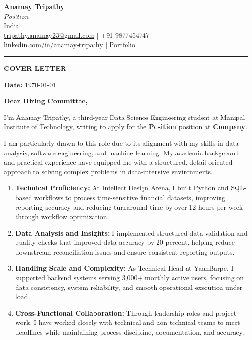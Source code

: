 \documentclass[11pt,a4]{article}
\begin{document}
\begin{center}
    \textbf{\Large Anamay Tripathy} \\[4pt]
    \textit{Position} \\
    India \\[4pt]
    \href{mailto:tripathy.anamay23@gmail.com}{tripathy.anamay23@gmail.com}
    \quad | \quad +91 9877454747 \\
    \href{https://www.linkedin.com/in/anamay-tripathy-b53829296/}{linkedin.com/in/anamay-tripathy}
    \quad | \quad \href{https://anamay.vercel.app/}{Portfolio}
\end{center}

\vspace{0.2cm}
\hrule
\vspace{0.4cm}

\begin{center}
    {\LARGE \textbf{COVER LETTER}}
\end{center}

\vspace{0.2cm}
\textbf{Date:} \today

\vspace{0.3cm}
\textbf{Dear Hiring Committee,}

\justify

I'm Anamay Tripathy, a third-year Data Science Engineering student at Manipal Institute of Technology, writing to apply for the \textbf{Position} position at \textbf{Company}.

I am particularly drawn to this role due to its alignment with my skills in data analysis, software engineering, and machine learning. My academic background and practical experience have equipped me with a structured, detail-oriented approach to solving complex problems in data-intensive environments.

\begin{enumerate}[leftmargin=*, label=\textbf{\arabic*.}]
    \item \textbf{Technical Proficiency:} At Intellect Design Arena, I built Python and SQL-based workflows to process time-sensitive financial datasets, improving reporting accuracy and reducing turnaround time by over 12 hours per week through workflow optimization.
    \item \textbf{Data Analysis and Insights:} I implemented structured data validation and quality checks that improved data accuracy by 20 percent, helping reduce downstream reconciliation issues and ensure consistent reporting outputs.
    \item \textbf{Handling Scale and Complexity:} As Technical Head at YaanBarpe, I supported backend systems serving 3,000+ monthly active users, focusing on data consistency, system reliability, and smooth operational execution under load.
    \item \textbf{Cross-Functional Collaboration:} Through leadership roles and project work, I have worked closely with technical and non-technical teams to meet deadlines while maintaining process discipline, documentation, and accuracy.
\end{enumerate}
\end{document}
